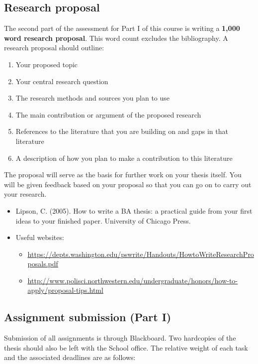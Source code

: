 \documentclass[a4paper,12pt]{article}
\begin{document}
\subsection*{Research proposal}

	The second part of the assessment for Part I of this course is writing a \textbf{1,000 word research proposal}. This word count excludes the bibliography. A research proposal should outline:

\begin{enumerate}
	\item Your proposed topic
	\item Your central research question
	\item The research methods and sources you plan to use
	\item The main contribution or argument of the proposed research
	\item References to the literature that you are building on and gaps in that literature
	\item A description of how you plan to make a contribution to this literature
\end{enumerate}

	The proposal will serve as the basis for further work on your thesis itself.  You will be given feedback based on your proposal so that you can go on to carry out your research.
	
\begin{itemize}
	\item Lipson, C. (2005). How to write a BA thesis: a practical guide from your first ideas to your finished paper. University of Chicago Press.
	\item Useful websites:
	\begin{itemize}
		\item \url{https://depts.washington.edu/pswrite/Handouts/HowtoWriteResearchProposals.pdf}
		\item \url{http://www.polisci.northwestern.edu/undergraduate/honors/how-to-apply/proposal-tips.html}
	\end{itemize} 
\end{itemize}

\subsection*{Assignment submission (Part I)}
	
	Submission of all assignments is through Blackboard. Two hardcopies of the thesis should also be left with the School office. The relative weight of each task and the associated deadlines are as follows:
\end{document}
